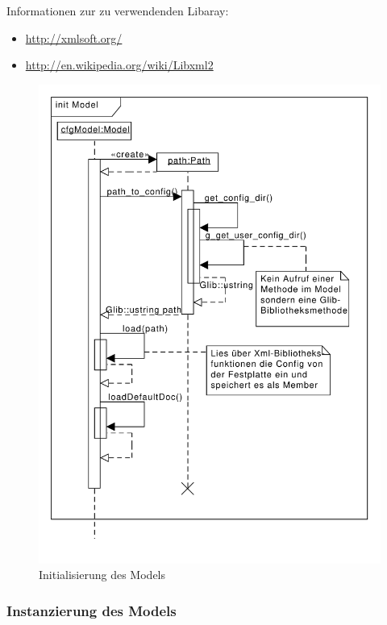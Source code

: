 Informationen zur zu verwendenden Libaray:

    \begin{itemize}
        \item \url{http://xmlsoft.org/}
        \item \url{http://en.wikipedia.org/wiki/Libxml2}
    \end{itemize}

\begin{figure}[htb!]
    \centering
    \includegraphics[scale=0.6]{./gfx/seq/init_model}
    \caption{Initialisierung des Models}
    \label{c_modelinit}
\end{figure}


\subsubsection{Instanzierung des Models}


